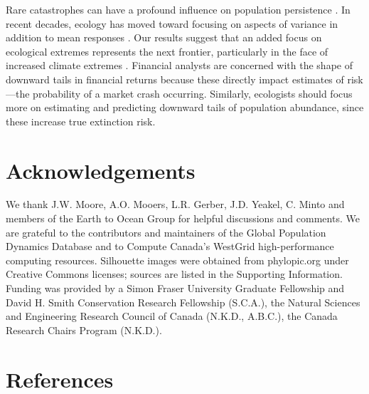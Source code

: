 Rare catastrophes can have a profound influence on population
persistence \citep{mangel1994}. In recent decades, ecology has moved toward
focusing on aspects of variance in addition to mean
responses \citep{thompson2013}. Our results suggest that an added focus on
ecological extremes represents the next frontier, particularly in the face of
increased climate extremes \citep{meehl2004, ipcc2012, thompson2013}. Financial
analysts are concerned with the shape of downward tails in financial returns 
because these directly impact estimates of risk---the probability of a
market crash occurring.
Similarly, ecologists should focus more
on estimating and predicting downward tails of population abundance, since
these increase true extinction risk.

\section{Acknowledgements}

We thank J.W. Moore, A.O. Mooers, L.R. Gerber, J.D. Yeakel, C. Minto and
members of the Earth to Ocean Group for helpful discussions and comments. We
are grateful to the contributors and maintainers of the Global Population
Dynamics Database and to Compute Canada's WestGrid high-performance computing
resources. Silhouette images were obtained from phylopic.org under Creative
Commons licenses; sources are listed in the Supporting Information. Funding was
provided by a Simon Fraser University Graduate Fellowship and David H. Smith
Conservation Research Fellowship (S.C.A.), the Natural Sciences and Engineering
Research Council of Canada (N.K.D., A.B.C.), the Canada Research Chairs Program
(N.K.D.).

\section{References}

\renewcommand{\section}[2]{}%




